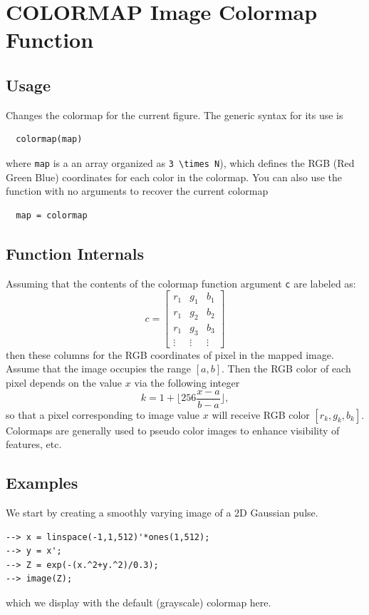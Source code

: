 \section{COLORMAP Image Colormap Function}

\subsection{Usage}

Changes the colormap for the current figure.  The generic syntax 
for its use is
\begin{verbatim}
  colormap(map)
\end{verbatim}
where \verb|map| is a an array organized as \verb|3 \times N|),
which defines the RGB (Red Green Blue) coordinates for each color in the
colormap.  You can also use the function with no arguments to recover
the current colormap
\begin{verbatim}
  map = colormap
\end{verbatim}
\subsection{Function Internals}

Assuming that the contents of the colormap function argument \verb|c| are 
labeled as:
\[
  c = \begin{bmatrix}
    r_1 & g_1 & b_1 \\
    r_1 & g_2 & b_2 \\
    r_1 & g_3 & b_3 \\
    \vdots & \vdots & \vdots 
      \end{bmatrix} 
\]
then these columns for the RGB coordinates of pixel in the mapped image.
Assume that the image occupies the range $[a,b]$.  Then the RGB color 
of each pixel depends on the value $x$ via the following integer
\[
  k = 1 + \lfloor 256 \frac{x-a}{b-a} \rfloor,
\]
so that a pixel corresponding to image value $x$ will receive RGB color 
$[r_k,g_k,b_k]$.
Colormaps are generally used to pseudo color images to enhance 
visibility of features, etc.
\subsection{Examples}

We start by creating a smoothly varying image of a 2D Gaussian pulse.
\begin{verbatim}
--> x = linspace(-1,1,512)'*ones(1,512);
--> y = x';
--> Z = exp(-(x.^2+y.^2)/0.3);
--> image(Z);
\end{verbatim}
which we display with the default (grayscale) colormap here.



